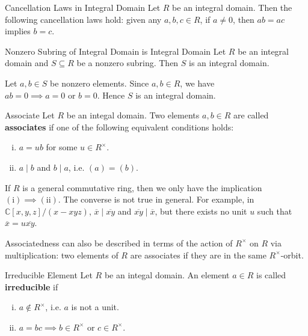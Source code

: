 \begin{proposition}{Cancellation Laws in Integral Domain}{}
    Let $R$ be an integral domain. Then the following cancellation laws hold: given any $a,b,c\in R$, if $a \ne 0$, then $ab = ac$ implies $b = c$.
\end{proposition}

\begin{proposition}{Nonzero Subring of Integral Domain is Integral Domain}{}
    Let $R$ be an integral domain and $S\subseteq R$ be a nonzero subring. Then $S$ is an integral domain.
\end{proposition}
\begin{prf}
    Let $a,b\in S$ be nonzero elements. Since $a,b\in R$, we have $ab=0\implies a=0\text{ or }b=0$. Hence $S$ is an integral domain.
\end{prf}

\begin{definition}{Associate}{}
    Let $R$ be an integal domain. Two elements $a,b\in R$ are called \textbf{associates} if one of the following equivalent conditions holds:
    \begin{enumerate}[(i)]
        \item $a=ub$ for some $u\in R^\times$.
        \item $a\mid b$ and $b\mid a$, i.e. $(a)=(b)$.
    \end{enumerate}
\end{definition}

If $R$ is a general commutative ring, then we only have the implication $(\mathrm i)\implies (\mathrm{ii})$. The converse is not true in general. For example, in $\mathbb{C}[x,y,z]/(x-xyz)$, $\overline{x}\mid \overline{xy}$ and $\overline{xy}\mid \overline{x}$, but there exists no unit $u$ such that $\overline{x}=u\overline{xy}$.

Associatedness can also be described in terms of the action of $R^\times$ on $R$ via multiplication: two elements of $R$ are associates if they are in the same $R^\times$-orbit.
\begin{definition}{Irreducible Element}{}
    Let $R$ be an integal domain. An element $a\in R$ is called \textbf{irreducible} if
    \begin{enumerate}[(i)]
        \item $a\notin R^\times$, i.e. $a$ is not a unit.
        \item $a=bc\implies b\in R^\times\text{ or }c\in R^\times$.
    \end{enumerate}    
\end{definition}

